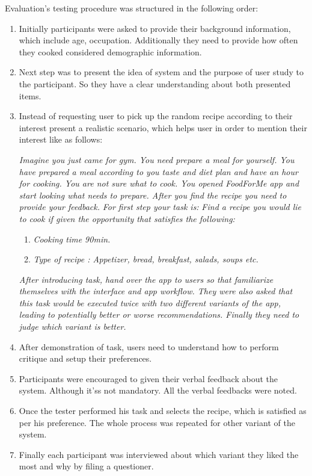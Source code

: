 Evaluation's testing procedure was structured in the following order:
 \begin{enumerate}
 	
 	\item  Initially participants were asked to provide their background information, which include age, occupation. Additionally they need to provide how often they cooked considered demographic information.
 	
 	\item Next step was to present the idea of system and the purpose of user study to the participant. So they have a clear understanding about both presented items.  
 	
 	\item Instead of requesting user to pick up the random recipe according to their interest present a realistic scenario, which helps user in order to mention their interest like as follows:\newline 
 	
 	\textit{Imagine you just came for gym. You need prepare a meal for yourself. You have prepared a meal according to you taste and diet plan and have an hour for cooking.  You are not sure what to cook. You opened FoodForMe app and start looking what needs to prepare. After you find the recipe you need to provide your feedback.}\newline
 	\textit{For first step your task is:}\newline
 	\textit{Find a recipe you would lie to cook if given the opportunity that satisfies the following:}
 	\begin{enumerate}
	 	\item \textit{Cooking time 90min.}
	 	\item \textit{Type of recipe : Appetizer,  bread, breakfast, salads, soups etc.}
 	\end{enumerate}
 	\textit{After introducing task, hand over the app to users so that familiarize themselves with the interface and app workflow. They were also asked that this task would be executed twice with two different variants of the app, leading to potentially better or worse recommendations. Finally they need to judge which variant is better.}
 	
 	\item After demonstration of task, users need to understand how to perform critique and setup their preferences. 
 	
 	\item Participants were encouraged to given their verbal feedback about the system. Although it'ss not mandatory. All the verbal feedbacks were noted. 
 	
 	\item Once the tester performed his task and selects the recipe, which is satisfied as per his preference. The whole process was repeated for other variant of the system. 

	\item Finally each participant was interviewed about which  variant they liked the most and why by filing a questioner. 

 \end{enumerate}
 
